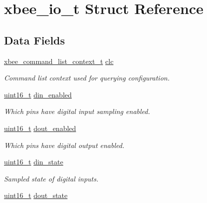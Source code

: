 \hypertarget{structxbee__io__t}{\section{xbee\-\_\-io\-\_\-t Struct Reference}
\label{structxbee__io__t}
}
\subsection*{Data Fields}
\begin{DoxyCompactItemize}
\item 
\hypertarget{group__xbee__io_ga55f4e774c0eb8d8dfbcdb7f1faff5ef6}{\hyperlink{structxbee__command__list__context__t}{xbee\-\_\-command\-\_\-list\-\_\-context\-\_\-t} \hyperlink{group__xbee__io_ga55f4e774c0eb8d8dfbcdb7f1faff5ef6}{clc}}\label{group__xbee__io_ga55f4e774c0eb8d8dfbcdb7f1faff5ef6}

\begin{DoxyCompactList}\small\item\em Command list context used for querying configuration. \end{DoxyCompactList}\item 
\hyperlink{group__hal_ga5a8b2dc9e45a9ee81a94ef304fb62505}{uint16\-\_\-t} \hyperlink{group__xbee__io_gabf150485c21c63b46d511cb50b2bf2df}{din\-\_\-enabled}
\begin{DoxyCompactList}\small\item\em Which pins have digital input sampling enabled. \end{DoxyCompactList}\item 
\hyperlink{group__hal_ga5a8b2dc9e45a9ee81a94ef304fb62505}{uint16\-\_\-t} \hyperlink{group__xbee__io_gab9c5cc4d30d476f26698c96f9aa329fe}{dout\-\_\-enabled}
\begin{DoxyCompactList}\small\item\em Which pins have digital output enabled. \end{DoxyCompactList}\item 
\hypertarget{group__xbee__io_gaef89a704cd7723b8bac1e3f6f1abd71f}{\hyperlink{group__hal_ga5a8b2dc9e45a9ee81a94ef304fb62505}{uint16\-\_\-t} \hyperlink{group__xbee__io_gaef89a704cd7723b8bac1e3f6f1abd71f}{din\-\_\-state}}\label{group__xbee__io_gaef89a704cd7723b8bac1e3f6f1abd71f}

\begin{DoxyCompactList}\small\item\em Sampled state of digital inputs. \end{DoxyCompactList}\item 
\hypertarget{group__xbee__io_gafffe3ca8d9c16b73247ec851e1c263ca}{\hyperlink{group__hal_ga5a8b2dc9e45a9ee81a94ef304fb62505}{uint16\-\_\-t} \hyperlink{group__xbee__io_gafffe3ca8d9c16b73247ec851e1c263ca}{dout\-\_\-state}}\label{group__xbee__io_gafffe3ca8d9c16b73247ec851e1c263ca}


\end{DoxyCompactItemize}
